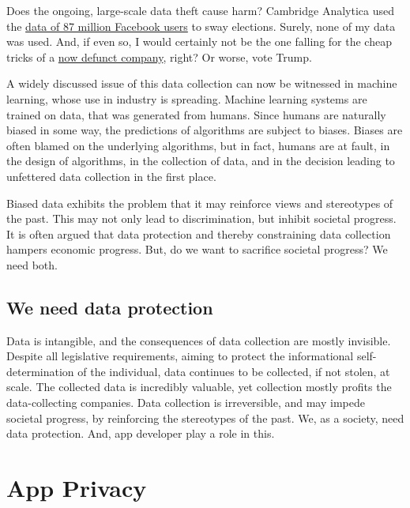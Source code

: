 \documentclass[
]{book}
\begin{document}
Does the ongoing, large-scale data theft cause harm? Cambridge Analytica used the \href{https://about.fb.com/news/2018/04/restricting-data-access/}{data of 87 million Facebook users} to sway elections. Surely, none of my data was used. And, if even so, I would certainly not be the one falling for the cheap tricks of a \href{https://www.theguardian.com/uk-news/2018/may/02/cambridge-analytica-closing-down-after-facebook-row-reports-say}{now defunct company}, right? Or worse, vote Trump.

A widely discussed issue of this data collection can now be witnessed in machine learning, whose use in industry is spreading. Machine learning systems are trained on data, that was generated from humans. Since humans are naturally biased in some way, the predictions of algorithms are subject to biases. Biases are often blamed on the underlying algorithms, but in fact, humans are at fault, in the design of algorithms, in the collection of data, and in the decision leading to unfettered data collection in the first place.

Biased data exhibits the problem that it may reinforce views and stereotypes of the past. This may not only lead to discrimination, but inhibit societal progress. It is often argued that data protection and thereby constraining data collection hampers economic progress. But, do we want to sacrifice societal progress? We need both.

\hypertarget{we-need-data-protection}{%
\section{We need data protection}\label{we-need-data-protection}}

Data is intangible, and the consequences of data collection are mostly invisible. Despite all legislative requirements, aiming to protect the informational self-determination of the individual, data continues to be collected, if not stolen, at scale. The collected data is incredibly valuable, yet collection mostly profits the data-collecting companies. Data collection is irreversible, and may impede societal progress, by reinforcing the stereotypes of the past. We, as a society, need data protection. And, app developer play a role in this.

\hypertarget{app-privacy}{%
\chapter{App Privacy}\label{app-privacy}}
\end{document}
